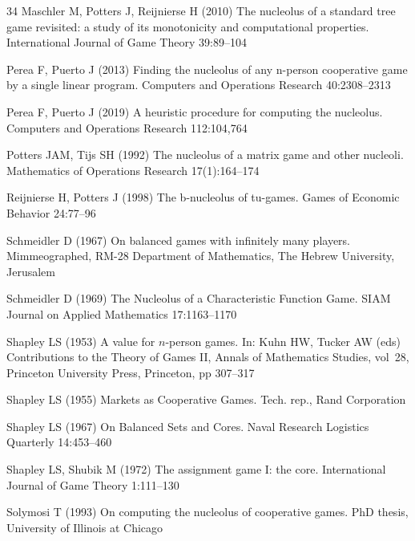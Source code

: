 \documentclass[a4paper,12pt]{article}
\theoremstyle{definition}
\theoremstyle{remark}
\begin{document}
\begin{thebibliography}{34}
Maschler M, Potters J, Reijnierse H (2010) The nucleolus of a standard tree
  game revisited: a study of its monotonicity and computational properties.
  International Journal of Game Theory 39:89--104

Perea F, Puerto J (2013) Finding the nucleolus of any n-person cooperative game
  by a single linear program. Computers and Operations Research 40:2308--2313

Perea F, Puerto J (2019) A heuristic procedure for computing the nucleolus.
  Computers and Operations Research 112:104,764

Potters JAM, Tijs SH (1992) The nucleolus of a matrix game and other nucleoli.
  Mathematics of Operations Research 17(1):164--174

Reijnierse H, Potters J (1998) The b-nucleolus of tu-games. Games of Economic
  Behavior 24:77--96

Schmeidler D (1967) {On balanced games with infinitely many players}.
  Mimmeographed, RM-28 Department of Mathematics, The Hebrew University,
  Jerusalem

Schmeidler D (1969) {The Nucleolus of a Characteristic Function Game}. SIAM
  Journal on Applied Mathematics 17:1163--1170

Shapley LS (1953) {A value for $n$-person games}. In: Kuhn HW, Tucker AW (eds)
  {Contributions to the Theory of Games {II}}, {Annals of Mathematics Studies},
  vol~28, Princeton University Press, Princeton, pp 307--317

Shapley LS (1955) {Markets as Cooperative Games}. Tech. rep., Rand Corporation

Shapley LS (1967) {On Balanced Sets and Cores}. Naval Research Logistics
  Quarterly 14:453--460

Shapley LS, Shubik M (1972) {The assignment game I: the core}. International
  Journal of Game Theory 1:111--130

Solymosi T (1993) On computing the nucleolus of cooperative games. PhD thesis,
  University of Illinois at Chicago


\end{thebibliography}
\end{document}
